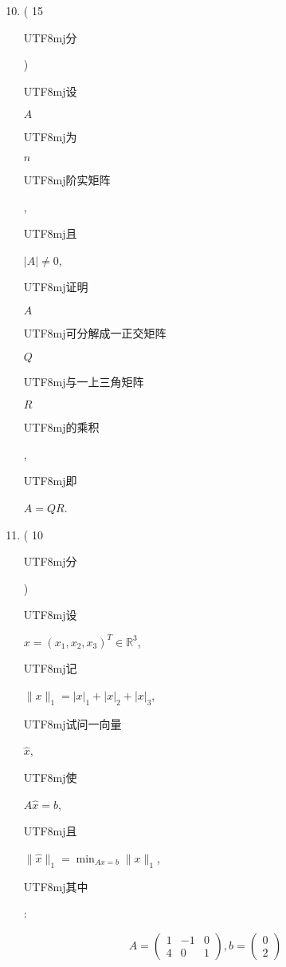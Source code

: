 \documentclass[10pt]{article}
\begin{document}
\begin{enumerate}
  \setcounter{enumi}{9}
  \item ( 15 \begin{CJK}{UTF8}{mj}分\end{CJK}) \begin{CJK}{UTF8}{mj}设\end{CJK} $A$ \begin{CJK}{UTF8}{mj}为\end{CJK} $n$ \begin{CJK}{UTF8}{mj}阶实矩阵\end{CJK}, \begin{CJK}{UTF8}{mj}且\end{CJK} $|A| \neq 0$, \begin{CJK}{UTF8}{mj}证明\end{CJK} $A$ \begin{CJK}{UTF8}{mj}可分解成一正交矩阵\end{CJK} $Q$ \begin{CJK}{UTF8}{mj}与一上三角矩阵\end{CJK} $R$ \begin{CJK}{UTF8}{mj}的乘积\end{CJK}, \begin{CJK}{UTF8}{mj}即\end{CJK} $A=Q R$.

  \item ( 10 \begin{CJK}{UTF8}{mj}分\end{CJK}) \begin{CJK}{UTF8}{mj}设\end{CJK} $x=\left(x_{1}, x_{2}, x_{3}\right)^{T} \in \mathbb{R}^{3}$, \begin{CJK}{UTF8}{mj}记\end{CJK} $\|x\|_{1}=|x|_{1}+|x|_{2}+|x|_{3}$, \begin{CJK}{UTF8}{mj}试问一向量\end{CJK} $\widehat{x}$, \begin{CJK}{UTF8}{mj}使\end{CJK} $A \widehat{x}=b$, \begin{CJK}{UTF8}{mj}且\end{CJK} $\|\widehat{x}\|_{1}=\min _{A x=b}\|x\|_{1}$, \begin{CJK}{UTF8}{mj}其中\end{CJK}:

\end{enumerate}
$$
A=\left(\begin{array}{ccc}
1 & -1 & 0 \\
4 & 0 & 1
\end{array}\right), b=\left(\begin{array}{l}
0 \\
2
\end{array}\right)
$$
\end{document}
